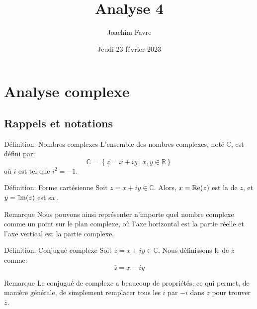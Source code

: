 \documentclass[a4paper]{article}
\title{Analyse 4}
\author{Joachim Favre}
\date{Jeudi 23 février 2023}
\begin{document}
\maketitle


\section{Analyse complexe}
\subsection{Rappels et notations}
\begin{parag}{Définition: Nombres complexes}
    L'ensemble des nombres complexes, noté $\mathbb{C}$, est défini par: 
    \[\mathbb{C} = \left\{z = x + iy \ |\ x, y \in \mathbb{R}\right\}\]
    où $i$ est tel que $i^2 = -1$.
\end{parag}

\begin{parag}{Définition: Forme cartésienne}
    Soit $z = x + iy \in \mathbb{C}$. Alors, $x = \cre\left(z\right)$ est la  de $z$, et $y = \cim\left(z\right)$ est sa .

    \begin{subparag}{Remarque}
        Nous pouvons ainsi représenter n'importe quel nombre complexe comme un point sur le plan complexe, où l'axe horizontal est la partie réelle et l'axe vertical est la partie complexe.
    \end{subparag}
\end{parag}

\begin{parag}{Définition: Conjugué complexe}
    Soit $z = x + iy \in \mathbb{C}$. Nous définissons le  de $z$ comme: 
    \[\bar{z} = x - iy\]

    \begin{subparag}{Remarque}
        Le conjugué de complexe a beaucoup de propriétés, ce qui permet, de manière générale, de simplement remplacer tous les $i$ par $-i$ dans $z$ pour trouver $\bar{z}$.
    \end{subparag}
\end{parag}
\end{document}

